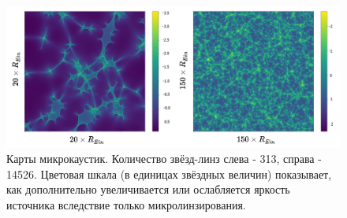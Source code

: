 \begin{figure}[H]
    \centering
	\includegraphics[scale=0.22]{pics/maps_example.png}
	\caption{Карты микрокаустик. Количество звёзд-линз слева - 313, справа - 14526. Цветовая шкала (в единицах звёздных величин) показывает, как дополнительно увеличивается или ослабляется яркость источника вследствие только микролинзирования. \label{fig:micromaps}} 
\end{figure}

